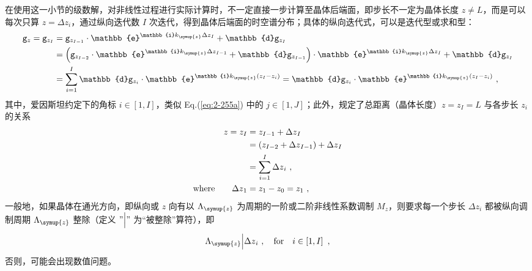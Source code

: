 在使用这一小节的级数解，对非线性过程进行实际计算时，不一定直接一步计算至晶体后端面，即步长不一定为晶体长度 $z \neq L$，而是可以每次只算 $z = {\Delta z}_i$，通过纵向迭代数 $I$ 次迭代，得到晶体后端面的时空谱分布；具体的纵向迭代式，可以是迭代型或求和型：
\begin{subequations} \label{eq:2-271}
	\abovedisplayskip=13pt
	\belowdisplayskip=13pt
	\begin{align}
		{\mathtt{g}}_{z} = {\mathtt{g}}_{z_I} &= {\mathtt{g}}_{z_{I-1}} \cdot \mathbb{e}^{\mathbb{i} k_{\symup{z}} {\Delta z}_{I}} + \mathbb{d} {\mathtt{g}}_{z_{I}} \label{eq:2-271a} \\ &= \left( {\mathtt{g}}_{z_{I-2}} \cdot \mathbb{e}^{\mathbb{i} k_{\symup{z}} {\Delta z}_{I-1}} + \mathbb{d} {\mathtt{g}}_{z_{I-1}} \right) \cdot \mathbb{e}^{\mathbb{i} k_{\symup{z}} {\Delta z}_{I}} + \mathbb{d} {\mathtt{g}}_{z_{I}} \label{eq:2-271b} \\ &= \sum^{I}_{i=1} \mathbb{d} {\mathtt{g}}_{z_{i}} \cdot \mathbb{e}^{\mathbb{i} k_{\symup{z}} \left( z_I - z_i \right)} = \mathbb{d} {\mathtt{g}}_{z_{i}} \cdot \mathbb{e}^{\mathbb{i} k_{\symup{z}} \left( z_I - z_i \right)} \label{eq:2-271c} ~,
	\end{align}
\end{subequations}
其中，爱因斯坦约定下的角标 $i \in \left[ 1, I \right]$，类似 Eq.(\ref{eq:2-255a}) 中的 $j \in \left[ 1, J \right]$；此外，规定了总距离（晶体长度）$z = z_I = L$ 与各步长 $z_i$ 的关系
\begin{subequations} \label{eq:2-272}
	\abovedisplayskip=13pt
	\belowdisplayskip=13pt
	\begin{align}
		z = z_I &= z_{I-1} + {\Delta z}_{I} \label{eq:2-272a} \\ &= \left( z_{I-2} + {\Delta z}_{I-1} \right) + {\Delta z}_{I} \label{eq:2-272b} \\ &= \sum^{I}_{i=1} {\Delta z}_{i} \label{eq:2-272c} ~, \\ \text{where}\ \ \ \ \ \ {\Delta z}_{1} &= z_1 - z_0 = z_1 \label{eq:2-272d} ~,
	\end{align}
\end{subequations}
一般地，如果晶体在通光方向，即纵向或 $z$ 向有以 $\Lambda_{\symup{z}}$ 为周期的一阶或二阶非线性系数调制 $M_z$，则要求每一个步长 ${\Delta z}_{i}$ 都被纵向调制周期 $\Lambda_{\symup{z}}$ 整除（定义 $"\Big|"$ 为“被整除”算符），即
\begin{equation} \label{eq:2-273}
	\Lambda_{\symup{z}} \Big| {\Delta z}_{i} ~, \ \ \ \text{for} \ \ \ i \in \left[ 1, I \right] ~,
\end{equation}
否则，可能会出现数值问题。

